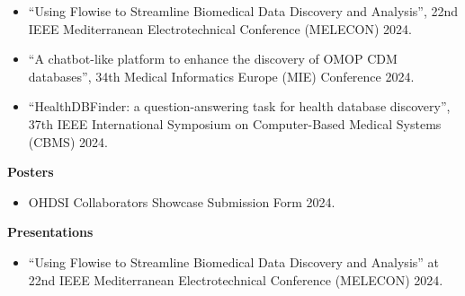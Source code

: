 \begin{itemize}
    \item ``Using Flowise to Streamline Biomedical Data Discovery and Analysis''\cite{reis2024flowise}, 22nd IEEE Mediterranean Electrotechnical Conference (MELECON) 2024.
    \item ``A chatbot-like platform to enhance the discovery of OMOP CDM databases''\cite{MIE}, 34th Medical Informatics Europe (MIE) Conference 2024.
    \item ``HealthDBFinder: a question-answering task for health database discovery''\cite{CBMS}, 37th IEEE International Symposium on Computer-Based Medical Systems (CBMS) 2024.
\end{itemize}


\noindent \textbf{Posters}

\begin{itemize}
    \item OHDSI Collaborators Showcase Submission Form 2024.
\end{itemize}


\noindent \textbf{Presentations}

\begin{itemize}
    \item ``Using Flowise to Streamline Biomedical Data Discovery and Analysis''\cite{reis2024flowise} at 22nd IEEE Mediterranean Electrotechnical Conference (MELECON) 2024.
\end{itemize}